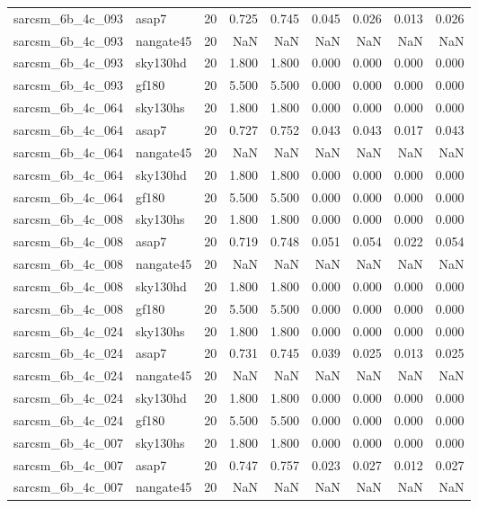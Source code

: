 \begin{tabular}{llrrrrrrr}
sarcsm\_6b\_4c\_093 & asap7 & 20 & 0.725 & 0.745 & 0.045 & 0.026 & 0.013 & 0.026 \\
sarcsm\_6b\_4c\_093 & nangate45 & 20 & NaN & NaN & NaN & NaN & NaN & NaN \\
sarcsm\_6b\_4c\_093 & sky130hd & 20 & 1.800 & 1.800 & 0.000 & 0.000 & 0.000 & 0.000 \\
sarcsm\_6b\_4c\_093 & gf180 & 20 & 5.500 & 5.500 & 0.000 & 0.000 & 0.000 & 0.000 \\
sarcsm\_6b\_4c\_064 & sky130hs & 20 & 1.800 & 1.800 & 0.000 & 0.000 & 0.000 & 0.000 \\
sarcsm\_6b\_4c\_064 & asap7 & 20 & 0.727 & 0.752 & 0.043 & 0.043 & 0.017 & 0.043 \\
sarcsm\_6b\_4c\_064 & nangate45 & 20 & NaN & NaN & NaN & NaN & NaN & NaN \\
sarcsm\_6b\_4c\_064 & sky130hd & 20 & 1.800 & 1.800 & 0.000 & 0.000 & 0.000 & 0.000 \\
sarcsm\_6b\_4c\_064 & gf180 & 20 & 5.500 & 5.500 & 0.000 & 0.000 & 0.000 & 0.000 \\
sarcsm\_6b\_4c\_008 & sky130hs & 20 & 1.800 & 1.800 & 0.000 & 0.000 & 0.000 & 0.000 \\
sarcsm\_6b\_4c\_008 & asap7 & 20 & 0.719 & 0.748 & 0.051 & 0.054 & 0.022 & 0.054 \\
sarcsm\_6b\_4c\_008 & nangate45 & 20 & NaN & NaN & NaN & NaN & NaN & NaN \\
sarcsm\_6b\_4c\_008 & sky130hd & 20 & 1.800 & 1.800 & 0.000 & 0.000 & 0.000 & 0.000 \\
sarcsm\_6b\_4c\_008 & gf180 & 20 & 5.500 & 5.500 & 0.000 & 0.000 & 0.000 & 0.000 \\
sarcsm\_6b\_4c\_024 & sky130hs & 20 & 1.800 & 1.800 & 0.000 & 0.000 & 0.000 & 0.000 \\
sarcsm\_6b\_4c\_024 & asap7 & 20 & 0.731 & 0.745 & 0.039 & 0.025 & 0.013 & 0.025 \\
sarcsm\_6b\_4c\_024 & nangate45 & 20 & NaN & NaN & NaN & NaN & NaN & NaN \\
sarcsm\_6b\_4c\_024 & sky130hd & 20 & 1.800 & 1.800 & 0.000 & 0.000 & 0.000 & 0.000 \\
sarcsm\_6b\_4c\_024 & gf180 & 20 & 5.500 & 5.500 & 0.000 & 0.000 & 0.000 & 0.000 \\
sarcsm\_6b\_4c\_007 & sky130hs & 20 & 1.800 & 1.800 & 0.000 & 0.000 & 0.000 & 0.000 \\
sarcsm\_6b\_4c\_007 & asap7 & 20 & 0.747 & 0.757 & 0.023 & 0.027 & 0.012 & 0.027 \\
sarcsm\_6b\_4c\_007 & nangate45 & 20 & NaN & NaN & NaN & NaN & NaN & NaN \\

\end{tabular}
